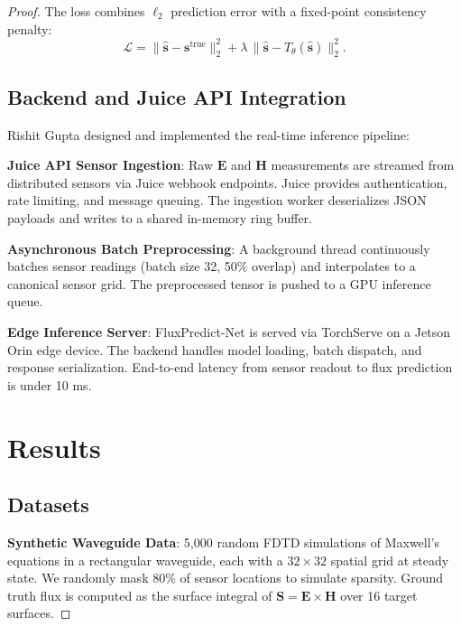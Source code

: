 \documentclass[12pt]{article}
\begin{document}
\begin{proof}
The loss combines $\ell_2$ prediction error with a fixed-point consistency penalty:
\begin{equation}
\mathcal{L} = \|\hat{\mathbf{s}} - \mathbf{s}^\text{true}\|_2^2 + \lambda \, \|\hat{\mathbf{s}} - T_\theta(\hat{\mathbf{s}})\|_2^2.
\label{eq:loss}
\end{equation}

\subsection{Backend and Juice API Integration}

Rishit Gupta designed and implemented the real-time inference pipeline:

\textbf{Juice API Sensor Ingestion}: Raw $\mathbf{E}$ and $\mathbf{H}$ measurements are streamed from distributed sensors via Juice webhook endpoints. Juice provides authentication, rate limiting, and message queuing. The ingestion worker deserializes JSON payloads and writes to a shared in-memory ring buffer.

\textbf{Asynchronous Batch Preprocessing}: A background thread continuously batches sensor readings (batch size 32, 50\% overlap) and interpolates to a canonical sensor grid. The preprocessed tensor is pushed to a GPU inference queue.

\textbf{Edge Inference Server}: FluxPredict-Net is served via TorchServe on a Jetson Orin edge device. The backend handles model loading, batch dispatch, and response serialization. End-to-end latency from sensor readout to flux prediction is under 10 ms.

\section{Results}

\subsection{Datasets}

\textbf{Synthetic Waveguide Data}: 5,000 random FDTD simulations of Maxwell's equations in a rectangular waveguide, each with a $32 \times 32$ spatial grid at steady state. We randomly mask 80\% of sensor locations to simulate sparsity. Ground truth flux is computed as the surface integral of $\mathbf{S} = \mathbf{E} \times \mathbf{H}$ over 16 target surfaces.


\end{proof}
\end{document}
